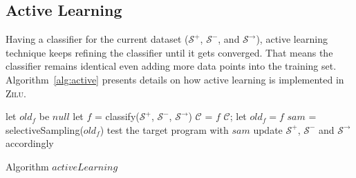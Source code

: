  



\subsection{Active Learning} 
\label{subsec:active:learning}
Having a classifier for the current dataset ($\mathcal{S}^+$, $\mathcal{S}^-$, and $\mathcal{S}^\rightarrow$), 
active learning technique keeps refining the classifier until it gets converged.
That means the classifier remains identical even adding more data points into the training set. 
Algorithm~\ref{alg:active} presents details on how active learning is implemented in \textsc{Zilu}. 

\begin{algorithm}[!h]
\SetAlgoVlined
\Indm
{}
\Indp
let $old_f$ be $null$\;
 {
    let $f$ = classify($\mathcal{S}^+$, $\mathcal{S}^-$, $\mathcal{S}^\rightarrow$)\;
     {
         {
            $\mathcal{C}$ = $f$\;
            \Return $\mathcal{C}$;
        }
        let $old_f = f$\;
    }
    $sam$ = selectiveSampling($old_f$)\;
    test the target program with $sam$\;
    update $\mathcal{S}^+$, $\mathcal{S}^-$ and $\mathcal{S}^\rightarrow$ accordingly\;
}
\caption{Algorithm $activeLearning$}
\label{alg:active}
\end{algorithm}

